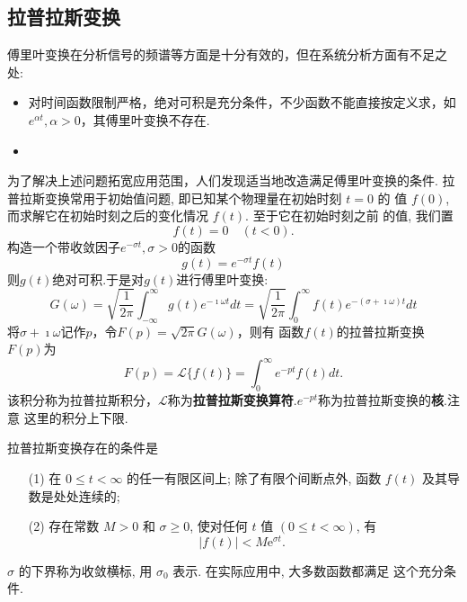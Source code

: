\subsection{拉普拉斯变换}
\label{subsec:laplace_transform}

傅里叶变换在分析信号的频谱等方面是十分有效的，但在系统分析方面有不足之处:

\begin{itemize}
    \item 对时间函数限制严格，绝对可积是充分条件，不少函数不能直接按定义求，如$e^{\alpha t}, \alpha > 0$，其傅里叶变换不存在.

    \item  
\end{itemize}
为了解决上述问题拓宽应用范围，人们发现适当地改造满足傅里叶变换的条件.
拉普拉斯变换常用于初始值问题, 即已知某个物理量在初始时刻 $t=0$ 的 值 $f(0)$, 而求解它在初始时刻之后的变化情况 $f(t)$.
 至于它在初始时刻之前 的值, 我们置
$$
f(t)=0 \quad(t<0) .
$$
构造一个带收敛因子$e^{-\sigma t}, \sigma > 0$的函数
$$
g(t) =e^{-\sigma t} f(t)
$$
则$g(t)$绝对可积.于是对$g(t)$进行傅里叶变换:
\begin{equation}
    G(\omega) = \sqrt{\frac{1}{2\pi} } \int_{-\infty}^{\infty} g(t) e^{-\imath \omega t} dt 
    = \sqrt{\frac{1}{2\pi} } \int_{0}^{\infty} f(t) e^{-(\sigma + \imath \omega) t} dt  
\end{equation}
将$\sigma + \imath \omega$记作$p$，令$F(p)=\sqrt{2\pi}G(\omega)$，则有
函数$f(t)$的拉普拉斯变换$F(p)$为
\begin{equation}
    F(p) = \mathcal{L} \{ f(t) \} = \int_0 ^{\infty} e^{-pt} f(t) dt .
\end{equation}
该积分称为拉普拉斯积分，$\mathcal{L}$称为\textbf{拉普拉斯变换算符}.$e^{-pt}$称为拉普拉斯变换的\textbf{核}.注意
这里的积分上下限.

拉普拉斯变换存在的条件是 
\begin{enumerate}
    \item[(1)]  在 $0 \leqslant t<\infty$ 的任一有限区间上; 除了有限个间断点外, 函数 $f(t)$ 及其导数是处处连续的;
    \item[(2)]  存在常数 $M>0$ 和 $\sigma \geqslant 0$, 使对任何 $t$ 值 $(0 \leqslant t<\infty)$, 有
    $$
    |f(t)|<M \mathrm{e}^{\sigma t} \text {. }
    $$
\end{enumerate}
$\sigma$ 的下界称为收敛横标, 用 $\sigma_0$ 表示. 在实际应用中, 大多数函数都满足 这个充分条件.

